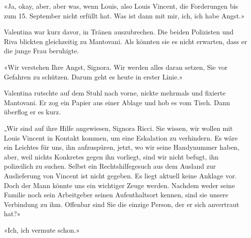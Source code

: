 «Ja, okay, aber, aber was, wenn Louis, also Louis Vincent, die Forderungen 
bis zum 15. September nicht erfüllt hat. Was ist dann mit mir, ich, ich habe Angst.»

Valentina war kurz davor, in Tränen auszubrechen.
Die beiden Polizisten und Riva blickten gleichzeitig zu Mantovani. Als
könnten sie es nicht erwarten, dass er die junge Frau beruhigte.

«Wir verstehen Ihre Angst, Signora. Wir werden alles daran setzen, Sie vor Gefahren zu schützen. Darum geht es heute in erster Linie.»

Valentina rutschte auf dem Stuhl nach vorne, nickte mehrmals und
fixierte Mantovani.
Er zog ein Papier aus einer Ablage und hob es vom Tisch. Dann überflog
er es kurz.

„Wir sind auf ihre Hilfe angewiesen, Signora Ricci. Sie wissen, wir
wollen mit Louis Vincent in Kontakt kommen, um eine Eskalation zu
verhindern. Es wäre ein Leichtes für uns, ihn aufzuspüren, jetzt, wo wir
seine Handynummer haben, aber, weil nichts Konkretes gegen ihn vorliegt,
sind wir nicht befugt, ihn polizeilich zu suchen. Selbst ein
Rechtshilfegesuch aus dem Ausland zur Auslieferung von Vincent ist nicht
gegeben. Es liegt aktuell keine Anklage vor. Doch der Mann könnte uns
ein wichtiger Zeuge werden. Nachdem weder seine Familie noch sein
Arbeitgeber seinen Aufenthaltsort kennen, sind sie unsere 
Verbindung zu ihm. Offenbar sind Sie die einzige Person, der er sich
anvertraut hat?»

«Ich, ich vermute schon.»
